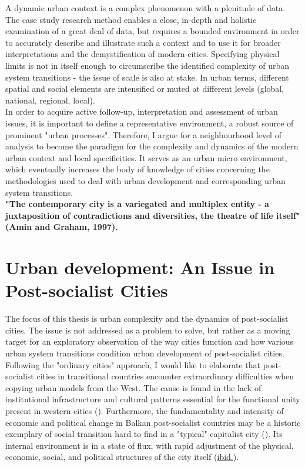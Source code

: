 \documentclass[11pt]{report}
\begin{document}
{A dynamic urban context is a complex phenomenon with a plenitude of data.
The case study research method enables a close, in-depth and holistic examination of a great deal of data, but requires a bounded environment in order to accurately describe and illustrate such a context and to use it for broader interpretations and the demystification of modern cities. Specifying physical limits is not in itself enough to circumscribe the identified complexity of urban system transitions - the issue of scale is also at stake. In urban terms, different spatial and social elements are intensified or muted at different levels (global, national, regional, local).
\\

In order to acquire active follow-up, interpretation and assessment of urban issues, it is important to define a representative environment, a robust source of prominent "urban processes". Therefore, I argue for a neighbourhood level of analysis to become the paradigm for the complexity and dynamics of the modern urban context and local specificities. It serves as an urban micro environment, which eventually increases the body of knowledge of cities concerning the methodologies used to deal with urban development and corresponding urban system  transitions.
\\

\textbf{"The contemporary city is a variegated and multiplex entity - a juxtaposition of contradictions and diversities, the theatre of life itself" (Amin and Graham, 1997).}

\section{Urban development: An Issue in Post-socialist Cities}

The focus of this thesis is urban complexity and the dynamics of post-socialist cities. The issue is not addressed as a problem to solve, but rather as a moving target for an exploratory observation of the way cities function and how various urban system transitions condition urban development of post-socialist cities.
\\

Following the "ordinary cities" approach, I would like to elaborate that post-socialist cities in transitional countries encounter extraordinary  difficulties  when  copying  urban  models from the West.
The cause is found in the lack of institutional infrastructure and cultural patterns essential for the functional unity present in western cities (\citealt{petrovic_cities_2009}). Furthermore, the fundamentality and intensity of economic and political change in Balkan post-socialist countries may be a historic exemplary of social transition hard to find in a "typical" capitalist city (\citealt{sykora_transitional_1999}). Its internal environment is in a state of flux, with rapid adjustment of the physical, economic, social, and political structures of the city itself (\href{ref}{ibid.}).
\\

}
\end{document}
